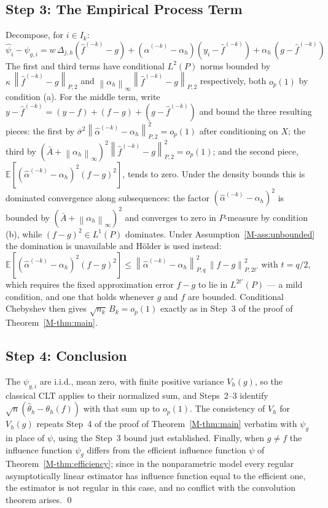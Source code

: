 \documentclass[12pt,a4paper]{article}
\numberwithin{equation}{section}
\theoremstyle{plain}
\theoremstyle{definition}
\newcommand{\norm}[1]{\left\| #1 \right\|}
\newcommand{\E}{\mathbb{E}}
\newcommand{\Dh}{\Delta_{j,h}}
\newcommand{\Ptwo}[1]{\norm{#1}_{P,2}}
\newcommand{\Pq}[2]{\norm{#1}_{P,#2}}
\begin{document}
	\subsection{Step 3: The Empirical Process Term}
	
	Decompose, for $i \in I_k$:
	\begin{equation}
		\hat{\psi}_i - \psi_{g,i}
		= w\, \Dh(\hat{f}^{(-k)} - g)
		+ (\hat{\alpha}^{(-k)} - \alpha_h)(y_i - \hat{f}^{(-k)})
		+ \alpha_h\,(g - \hat{f}^{(-k)})
	\end{equation}
	The first and third terms have conditional $L^2(P)$ norms bounded by
	$\kappa\, \Ptwo{\hat{f}^{(-k)} - g}$ and
	$\norm{\alpha_h}_\infty \Ptwo{\hat{f}^{(-k)} - g}$ respectively, both $o_p(1)$
	by condition (a). For the middle term, write
	$y - \hat{f}^{(-k)} = (y - f) + (f - g) + (g - \hat{f}^{(-k)})$ and bound the
	three resulting pieces: the first by
	$\bar{\sigma}^2 \Ptwo{\hat{\alpha}^{(-k)} - \alpha_h}^2 = o_p(1)$ after
	conditioning on $X$; the third by
	$(\bar{A} + \norm{\alpha_h}_\infty)^2 \Ptwo{\hat{f}^{(-k)} - g}^2 = o_p(1)$; and
	the second piece, $\E[(\hat{\alpha}^{(-k)} - \alpha_h)^2 (f - g)^2]$, tends to
	zero. Under the density bounds this is dominated convergence along subsequences:
	the factor $(\hat{\alpha}^{(-k)} - \alpha_h)^2$ is bounded by
	$(\bar{A} + \norm{\alpha_h}_\infty)^2$ and converges to zero in $P$-measure by
	condition (b), while $(f - g)^2 \in L^1(P)$ dominates. Under
	Assumption~\ref{M-ass:unbounded} the domination is unavailable and H\"{o}lder is
	used instead:
	$\E[(\hat{\alpha}^{(-k)} - \alpha_h)^2 (f - g)^2]
	\leq \Pq{\hat{\alpha}^{(-k)} - \alpha_h}{q}^2\, \Pq{f - g}{2t'}^2$ with
	$t = q/2$, which requires the fixed approximation error $f - g$ to lie in
	$L^{2t'}(P)$ --- a mild condition, and one that holds whenever $g$ and $f$ are
	bounded. Conditional Chebyshev then
	gives $\sqrt{n_k}\, B_k = o_p(1)$ exactly as in Step~3 of the proof of
	Theorem~\ref{M-thm:main}.
	
	\subsection{Step 4: Conclusion}
	
	The $\psi_{g,i}$ are i.i.d., mean zero, with finite positive variance $V_h(g)$,
	so the classical CLT applies to their normalized sum, and Steps~2--3 identify
	$\sqrt{n}(\hat{\theta}_h - \theta_h(f))$ with that sum up to $o_p(1)$. The
	consistency of $\hat{V}_h$ for $V_h(g)$ repeats Step~4 of the proof of
	Theorem~\ref{M-thm:main} verbatim with $\psi_{g}$ in place of $\psi$, using the
	Step~3 bound just established. Finally, when $g \neq f$ the influence function
	$\psi_g$ differs from the efficient influence function $\psi$ of
	Theorem~\ref{M-thm:efficiency}; since in the nonparametric model every regular
	asymptotically linear estimator has influence function equal to the efficient
	one, the estimator is not regular in this case, and no conflict with the
	convolution theorem arises.
	\qed
	
\end{document}
